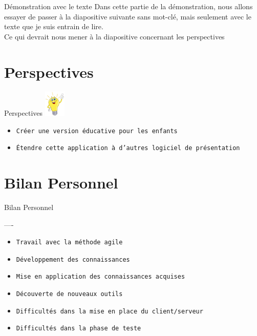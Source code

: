 \documentclass[10pt]{beamer}
\begin{document}
\begin{frame}{Démonstration avec le texte}
	Dans cette partie de la démonstration, nous allons essayer de passer à la diapositive suivante sans mot-clé, mais seulement avec le texte que je suis entrain de lire. \\	
	
	Ce qui devrait nous mener à la diapositive concernant les perspectives
\end{frame}


\section{Perspectives}
\begin{frame}{Perspectives}
		\includegraphics[width=1cm]{./images/idee}
	  	\begin{itemize}
			\item {\tt Créer une version éducative pour les enfants}
			\item {\tt Étendre cette application à d'autres logiciel de présentation}
		\end{itemize}
\end{frame}

\section{Bilan Personnel}
\begin{frame}{Bilan Personnel}
	\begin{block}{----}
	  	\begin{itemize}
	  		\item {\tt Travail avec la méthode agile}
			\item {\tt Développement des connaissances}
			\item {\tt Mise en application des connaissances acquises}	
			\item {\tt Découverte de nouveaux outils}
			\item {\tt Difficultés dans la mise en place du client/serveur}
			\item {\tt Difficultés dans la phase de teste}
		\end{itemize}
	\end{block}
\end{frame}
\end{document}

